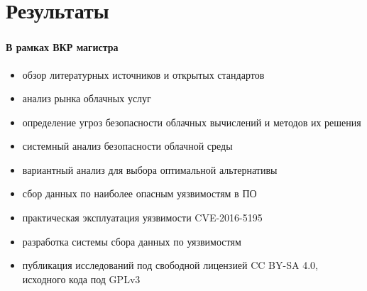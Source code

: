 
\section{Результаты}

\begin{frame}
\frametitle{\insertsection}
\framesubtitle{В рамках ВКР магистра}

\begin{itemize}
    \item обзор литературных источников и открытых стандартов
    \item анализ рынка облачных услуг
    \item определение угроз безопасности облачных вычислений и методов их решения
    \item системный анализ безопасности облачной среды
    \item вариантный анализ для выбора оптимальной альтернативы
    \item сбор данных по наиболее опасным уязвимостям в ПО
    \item практическая эксплуатация уязвимости CVE-2016-5195
    \item разработка системы сбора данных по уязвимостям
    \item публикация исследований под свободной лицензией CC BY-SA 4.0, исходного кода под GPLv3
\end{itemize}
\end{frame}

